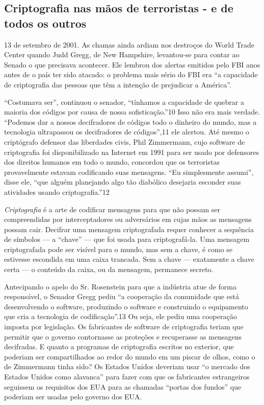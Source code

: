 \documentclass{book}
\newcommand{\ingles}[1]{\textit{#1}}
\begin{document}

\subsection{Criptografia nas mãos de terroristas - e de todos os outros}
\label{segredos:criptografia}

13 de setembro de 2001. As chamas ainda ardiam nos destroços do World Trade Center quando Judd Gregg, de New Hampshire, levantou-se para contar ao Senado o que precisava acontecer. Ele lembrou dos alertas emitidos pelo FBI anos antes de o país ter sido atacado: o problema mais sério do FBI era ``a capacidade de criptografia das pessoas que têm a intenção de prejudicar a América''.

``Costumava ser'', continuou o senador, ``tínhamos a capacidade de quebrar a maioria dos códigos por causa de nossa sofisticação.''10 Isso não era mais verdade. ``Podemos dar a nossos decifradores de códigos todo o dinheiro do mundo, mas a tecnologia ultrapassou os decifradores de códigos'',11 ele alertou. Até mesmo o criptógrafo defensor das liberdades civis, Phil Zimmermann, cujo software de criptografia foi disponibilizado na Internet em 1991 para ser usado por defensores dos direitos humanos em todo o mundo, concordou que os terroristas provavelmente estavam codificando suas mensagens. ``Eu simplesmente assumi'', disse ele, ``que alguém planejando algo tão diabólico desejaria esconder suas atividades usando criptografia.''12

\ingles{Criptografia} é a arte de codificar mensagens para que não possam ser compreendidas por interceptadores ou adversários em cujas mãos as mensagens possam cair. Decifrar uma mensagem criptografada requer conhecer a sequência de símbolos --- a ``chave'' --- que foi usada para criptografá-la. Uma mensagem criptografada pode ser visível para o mundo, mas sem a chave, é como se estivesse escondida em uma caixa trancada. Sem a chave --- exatamente a chave certa --- o conteúdo da caixa, ou da mensagem, permanece secreto.

Antecipando o apelo do Sr. Rosenstein para que a indústria atue de forma responsável, o Senador Gregg pediu ``a cooperação da comunidade que está desenvolvendo o software, produzindo o software e construindo o equipamento que cria a tecnologia de codificação''.13 Ou seja, ele pediu uma cooperação imposta por legislação. Os fabricantes de software de criptografia teriam que permitir que o governo contornasse as proteções e recuperasse as mensagens decifradas. E quanto a programas de criptografia escritos no exterior, que poderiam ser compartilhados ao redor do mundo em um piscar de olhos, como o de Zimmermann tinha sido? Os Estados Unidos deveriam usar ``o mercado dos Estados Unidos como alavanca'' para fazer com que os fabricantes estrangeiros seguissem os requisitos dos EUA para as chamadas ``portas dos fundos'' que poderiam ser usadas pelo governo dos EUA.
\end{document}
